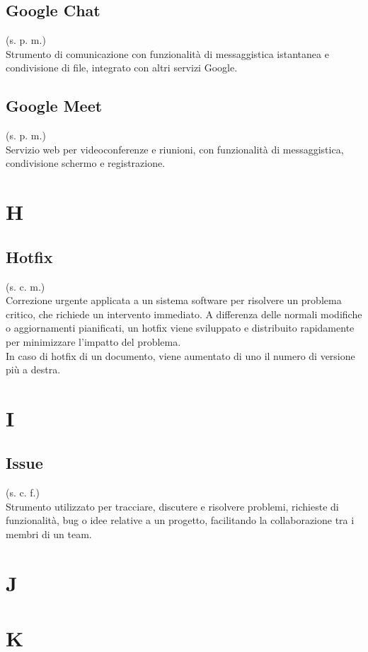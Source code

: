     \subsection{Google Chat}
    (s. p. m.)\\
    Strumento di comunicazione con funzionalità di messaggistica
    istantanea e condivisione di file, integrato con altri servizi Google.
    \subsection{Google Meet}    
    (s. p. m.)\\
    Servizio web per videoconferenze e riunioni, con funzionalità di messaggistica,
    condivisione schermo e registrazione.
\pagebreak
\section{H}
    \subsection{Hotfix}
    (s. c. m.)\\
    Correzione urgente applicata a un sistema software per risolvere un problema critico, 
    che richiede un intervento immediato. A differenza delle normali modifiche o aggiornamenti pianificati, 
    un hotfix viene sviluppato e distribuito rapidamente per minimizzare l'impatto del problema.\\
    In caso di hotfix di un documento, viene aumentato di uno il numero di versione più a destra.
\pagebreak
\section{I}
    \subsection{Issue}
    \label{Issue}
    (s. c. f.)\\
    Strumento utilizzato per tracciare, discutere e risolvere problemi, richieste di funzionalità, 
    bug o idee relative a un progetto, facilitando la collaborazione tra i membri di un team.
\pagebreak
\section{J}
\pagebreak
\section{K}
\pagebreak
